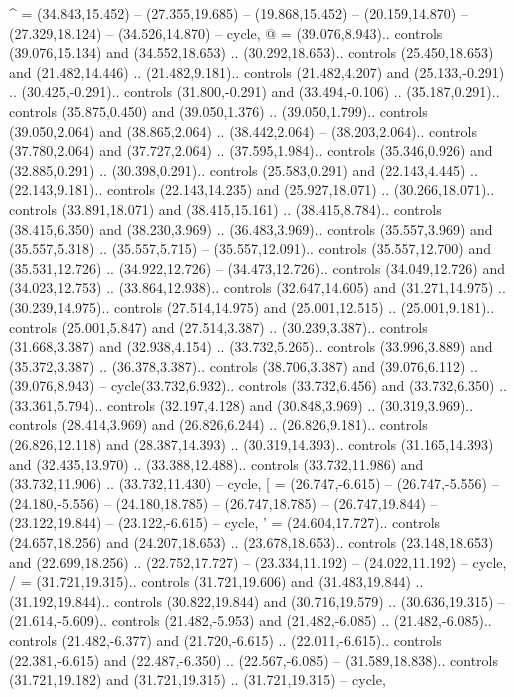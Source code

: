 {^} = {(34.843,15.452) -- (27.355,19.685) -- (19.868,15.452) -- (20.159,14.870) -- (27.329,18.124) -- (34.526,14.870) -- cycle},
{@} = {(39.076,8.943).. controls (39.076,15.134) and (34.552,18.653) .. (30.292,18.653).. controls (25.450,18.653) and (21.482,14.446) .. (21.482,9.181).. controls (21.482,4.207) and (25.133,-0.291) .. (30.425,-0.291).. controls (31.800,-0.291) and (33.494,-0.106) .. (35.187,0.291).. controls (35.875,0.450) and (39.050,1.376) .. (39.050,1.799).. controls (39.050,2.064) and (38.865,2.064) .. (38.442,2.064) -- (38.203,2.064).. controls (37.780,2.064) and (37.727,2.064) .. (37.595,1.984).. controls (35.346,0.926) and (32.885,0.291) .. (30.398,0.291).. controls (25.583,0.291) and (22.143,4.445) .. (22.143,9.181).. controls (22.143,14.235) and (25.927,18.071) .. (30.266,18.071).. controls (33.891,18.071) and (38.415,15.161) .. (38.415,8.784).. controls (38.415,6.350) and (38.230,3.969) .. (36.483,3.969).. controls (35.557,3.969) and (35.557,5.318) .. (35.557,5.715) -- (35.557,12.091).. controls (35.557,12.700) and (35.531,12.726) .. (34.922,12.726) -- (34.473,12.726).. controls (34.049,12.726) and (34.023,12.753) .. (33.864,12.938).. controls (32.647,14.605) and (31.271,14.975) .. (30.239,14.975).. controls (27.514,14.975) and (25.001,12.515) .. (25.001,9.181).. controls (25.001,5.847) and (27.514,3.387) .. (30.239,3.387).. controls (31.668,3.387) and (32.938,4.154) .. (33.732,5.265).. controls (33.996,3.889) and (35.372,3.387) .. (36.378,3.387).. controls (38.706,3.387) and (39.076,6.112) .. (39.076,8.943) -- cycle(33.732,6.932).. controls (33.732,6.456) and (33.732,6.350) .. (33.361,5.794).. controls (32.197,4.128) and (30.848,3.969) .. (30.319,3.969).. controls (28.414,3.969) and (26.826,6.244) .. (26.826,9.181).. controls (26.826,12.118) and (28.387,14.393) .. (30.319,14.393).. controls (31.165,14.393) and (32.435,13.970) .. (33.388,12.488).. controls (33.732,11.986) and (33.732,11.906) .. (33.732,11.430) -- cycle},
{[} = {(26.747,-6.615) -- (26.747,-5.556) -- (24.180,-5.556) -- (24.180,18.785) -- (26.747,18.785) -- (26.747,19.844) -- (23.122,19.844) -- (23.122,-6.615) -- cycle},
{'} = {(24.604,17.727).. controls (24.657,18.256) and (24.207,18.653) .. (23.678,18.653).. controls (23.148,18.653) and (22.699,18.256) .. (22.752,17.727) -- (23.334,11.192) -- (24.022,11.192) -- cycle},
{/} = {(31.721,19.315).. controls (31.721,19.606) and (31.483,19.844) .. (31.192,19.844).. controls (30.822,19.844) and (30.716,19.579) .. (30.636,19.315) -- (21.614,-5.609).. controls (21.482,-5.953) and (21.482,-6.085) .. (21.482,-6.085).. controls (21.482,-6.377) and (21.720,-6.615) .. (22.011,-6.615).. controls (22.381,-6.615) and (22.487,-6.350) .. (22.567,-6.085) -- (31.589,18.838).. controls (31.721,19.182) and (31.721,19.315) .. (31.721,19.315) -- cycle},
